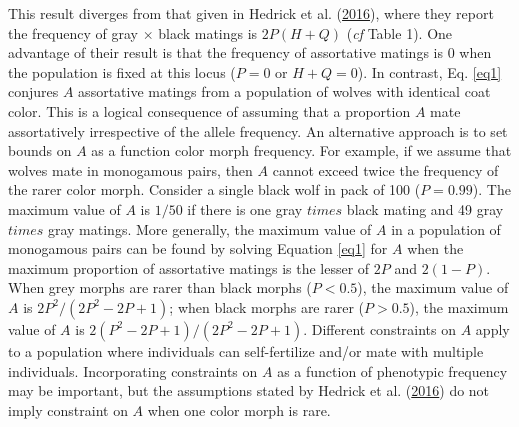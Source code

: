 \documentclass[
]{article}
\begin{document}
This result diverges from that given in Hedrick et al. (\protect\hyperlink{ref-hedrick_negative-assortative_2016}{2016}), where they report the frequency of gray \(\times\) black matings is \(2 P (H + Q)\) (\emph{cf} Table 1). One advantage of their result is that the frequency of assortative matings is 0 when the population is fixed at this locus (\(P = 0\) or \(H + Q = 0\)). In contrast, Eq. \ref{eq1} conjures \(A\) assortative matings from a population of wolves with identical coat color. This is a logical consequence of assuming that a proportion \(A\) mate assortatively irrespective of the allele frequency. An alternative approach is to set bounds on \(A\) as a function color morph frequency. For example, if we assume that wolves mate in monogamous pairs, then \(A\) cannot exceed twice the frequency of the rarer color morph. Consider a single black wolf in pack of 100 (\(P = 0.99\)). The maximum value of \(A\) is \(1/50\) if there is one gray \(times\) black mating and 49 gray \(times\) gray matings. More generally, the maximum value of \(A\) in a population of monogamous pairs can be found by solving Equation \ref{eq1} for \(A\) when the maximum proportion of assortative matings is the lesser of \(2P\) and \(2(1 - P)\). When grey morphs are rarer than black morphs (\(P < 0.5\)), the maximum value of \(A\) is \(2P ^ 2 / (2P ^ 2 - 2 P + 1)\); when black morphs are rarer (\(P > 0.5\)), the maximum value of \(A\) is \(2 (P^2 - 2P + 1) / (2 P ^ 2 - 2 P + 1)\). Different constraints on \(A\) apply to a population where individuals can self-fertilize and/or mate with multiple individuals. Incorporating constraints on \(A\) as a function of phenotypic frequency may be important, but the assumptions stated by Hedrick et al. (\protect\hyperlink{ref-hedrick_negative-assortative_2016}{2016}) do not imply constraint on \(A\) when one color morph is rare.
\end{document}

